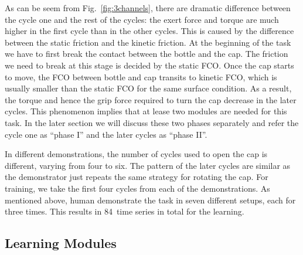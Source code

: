 As can be seem from Fig.~\ref{fig:3channels}, there are dramatic difference between the cycle one and the rest of the cycles: the exert force and torque are much higher in the first cycle than in the other cycles. This is caused by the difference between the static friction and the kinetic friction. At the beginning of the task we have to first break the contact between the bottle and the cap. The friction we need to break at this stage is decided by the static FCO. Once the cap starts to move, the FCO between bottle and cap transits to kinetic FCO, which is usually smaller than the static FCO for the same surface condition. As a result, the torque and hence the grip force required to turn the cap decrease in the later cycles. This phenomenon implies that at lease two modules are needed for this task. In the later section we will discuss these two phases separately and refer the cycle one as ``phase I'' and the later cycles as ``phase II''.

In different demonstrations, the number of cycles used to open the cap is different, varying from four to six. The pattern of the later cycles are similar as the demonstrator just repeats the same strategy for rotating the cap. For training, we take the first four cycles from each of the demonstrations. As mentioned above, human demonstrate the task in seven different setups, each for three times. This results in 84~time series in total for the learning.








\subsection{Learning Modules}
\label{cha4:sec3:learning}

